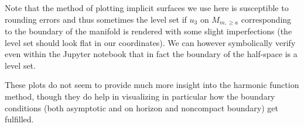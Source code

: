 \documentclass[titlepage,numbers=noenddot,headinclude,oneside,%
footinclude=true,cleardoublepage=empty,%
BCOR=5mm,paper=a4,fontsize=11pt,%
english,%
]{scrartcl}
\begin{document}
Note that the method of plotting implicit surfaces we use here is susceptible to rounding errors and thus sometimes the level set if \( u_3 \) on \( M_{m,\geq a} \) corresponding to the boundary of the manifold is rendered with some slight imperfections (the level set should look flat in our coordinates). We can however symbolically verify even within the Jupyter notebook that in fact the boundary of the half-space is a level set.

These plots do not seem to provide much more insight into the harmonic function method, though they do help in visualizing in particular how the boundary conditions (both asymptotic and on horizon and noncompact boundary) get fulfilled.

\begin{figure}
    \centering
    \begin{subfigure}{.45\textwidth}

\end{subfigure}
\end{figure}
\end{document}
